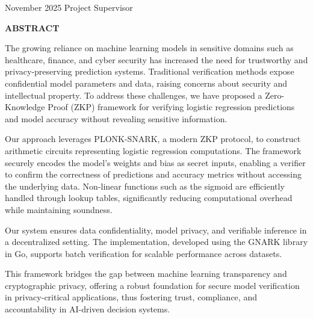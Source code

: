 \documentclass[12pt,a4wide]{report}
\begin{document}
\noindent November 2025 \hfill Project Supervisor

\clearpage

\begin{center}
{\Large\bf ABSTRACT}
\end{center}

The growing reliance on machine learning models in sensitive domains such as healthcare, finance, and cyber security has increased the need for trustworthy and privacy-preserving prediction systems. Traditional verification methods expose confidential model parameters and data, raising concerns about security and intellectual property. To address these challenges, we have proposed a Zero-Knowledge Proof (ZKP) framework for verifying logistic regression predictions and model accuracy without revealing sensitive information.

Our approach leverages PLONK-SNARK, a modern ZKP protocol, to construct arithmetic circuits representing logistic regression computations. The framework securely encodes the model’s weights and bias as secret inputs, enabling a verifier to confirm the correctness of predictions and accuracy metrics without accessing the underlying data. Non-linear functions such as the sigmoid are efficiently handled through lookup tables, significantly reducing computational overhead while maintaining soundness.

Our system ensures data confidentiality, model privacy, and verifiable inference in a decentralized setting. The implementation, developed using the GNARK library in Go, supports batch verification for scalable performance across datasets.

This framework bridges the gap between machine learning transparency and cryptographic privacy, offering a robust foundation for secure model verification in privacy-critical applications, thus fostering trust, compliance, and accountability in AI-driven decision systems.


\clearpage

\tableofcontents
\clearpage
\listoffigures
\clearpage
\listoftables
\clearpage

\setcounter{page}{1}









\nocite{*}


\end{document}
